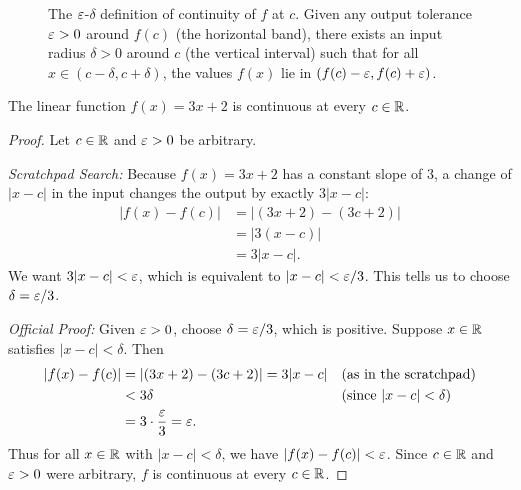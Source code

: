 \begin{figure}[htbp]
\caption{The $\varepsilon$-$\delta$ definition of continuity of $f$ at $c$. Given any output tolerance $\varepsilon > 0$ around $f(c)$ (the horizontal band), there exists an input radius $\delta > 0$ around $c$ (the vertical interval) such that for all $x \in (c - \delta, c + \delta)$, the values $f(x)$ lie in $(f(c) - \varepsilon, f(c) + \varepsilon)$.}\label{20:fig-function-epsilon-delta}
\end{figure}

\begin{theorem}
The linear function $f(x) = 3x + 2$ is continuous at every $c \in \mathbb{R}$.
\end{theorem}

\begin{proof}
Let $c \in \mathbb{R}$ and $\varepsilon > 0$ be arbitrary.

\emph{Scratchpad Search:} Because $f(x) = 3x + 2$ has a constant slope of $3$, a change of $|x - c|$ in the input changes the output by exactly $3|x - c|$:
\begin{align*}
|f(x) - f(c)| &= |(3x + 2) - (3c + 2)|\\
&= |3(x - c)|\\
&= 3|x - c|.
\end{align*}
We want $3|x - c| < \varepsilon$, which is equivalent to $|x - c| < \varepsilon/3$. This tells us to choose $\delta = \varepsilon / 3$.

\emph{Official Proof:}
Given $\varepsilon > 0$, choose $\delta = \varepsilon/3$, which is positive. Suppose $x \in \mathbb{R}$ satisfies $|x - c| < \delta$. Then
\begin{align*}
|f(x) - f(c)| &= |(3x + 2) - (3c + 2)| = 3|x - c| && \text{(as in the scratchpad)}\\
&< 3\delta && \text{(since $|x - c| < \delta$)}\\
&= 3 \cdot \frac{\varepsilon}{3} = \varepsilon.
\end{align*}
Thus for all $x \in \mathbb{R}$ with $|x - c| < \delta$, we have $|f(x) - f(c)| < \varepsilon$. Since $c \in \mathbb{R}$ and $\varepsilon > 0$ were arbitrary, $f$ is continuous at every $c \in \mathbb{R}$.
\end{proof}

